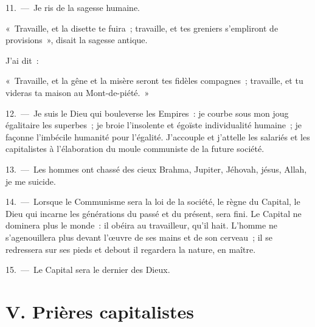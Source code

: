 \documentclass[french,twoside]{book} %
\begin{document}
11. — Je ris de la sagesse humaine.\par
« Travaille, et la disette te fuira ; travaille, et tes greniers s’empliront de provisions », disait la sagesse antique.\par
J'ai dit :\par
« Travaille, et la gêne et la misère seront tes fidèles compagnes ; travaille, et tu videras ta maison au Mont-de-piété. »\par
12. — Je suis le Dieu qui bouleverse les Empires : je courbe sous mon joug égalitaire les superbes ; je broie l’insolente et égoïste individualité humaine ; je façonne l’imbécile humanité pour l’égalité. J'accouple et j’attelle les salariés et les capitalistes à l’élaboration du moule communiste de la future société.\par
13. — Les hommes ont chassé des cieux Brahma, Jupiter, Jéhovah, jésus, Allah, je me suicide.\par
14. — Lorsque le Communisme sera la loi de la société, le règne du Capital, le Dieu qui incarne les générations du passé et du présent, sera fini. Le Capital ne dominera plus le monde : il obéira au travailleur, qu’il hait. L'homme ne s’agenouillera plus devant l’œuvre de ses mains et de son cerveau ; il se redressera sur ses pieds et debout il regardera la nature, en maître.\par
15. — Le Capital sera le dernier des Dieux.
\section[{V. Prières capitalistes}]{V. Prières capitalistes}\renewcommand{\leftmark}{V. Prières capitalistes}
\end{document}

